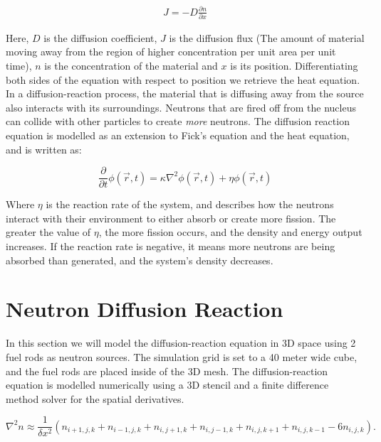 \documentclass[letterpaper, 12pt]{article}
\begin{document}
         \begin{align*}
            J = -D \frac{\partial n}{\partial x}
         \end{align*}

         Here, $D$ is the diffusion coefficient, $J$ is the diffusion flux (The amount of material moving away from the region of higher concentration per unit area per unit time), $n$ is the concentration of the material and $x$ is its position. Differentiating both sides of the equation with respect to position we retrieve the heat equation.\\

         In a diffusion-reaction process, the material that is diffusing away from the source also interacts with its surroundings. Neutrons that are fired off from the nucleus can collide with other particles to create \textit{more} neutrons. The diffusion reaction equation is modelled as an extension to Fick's equation and the heat equation, and is written as:

         \begin{equation}
            \frac{\partial}{\partial t} \phi (\vec{r}, t) = \kappa \nabla^2 \phi (\vec{r}, t) + \eta \phi (\vec{r}, t)
         \end{equation}

         Where $\eta$ is the reaction rate of the system, and describes how the neutrons interact with their environment to either absorb or create more fission. The greater the value of $\eta$, the more fission occurs, and the density and energy output increases. If the reaction rate is negative, it means more neutrons are being absorbed than generated, and the system's density decreases.
    \section{ Neutron Diffusion Reaction}
      In this section we will model the diffusion-reaction equation in 3D space using 2 fuel rods as neutron sources. The simulation grid is set to a 40 meter wide cube, and the fuel rods are placed inside of the 3D mesh. The diffusion-reaction equation is modelled numerically using a 3D stencil and a finite difference method solver for the spatial derivatives.

      \begin{equation}
         \nabla^2 n \approx \frac{1}{\delta x^2} \left( n_{i+1, j, k} + n_{i-1, j, k} + n_{i, j+1, k} + n_{i, j-1, k} + n_{i, j, k+1} + n_{i, j, k-1} - 6n_{i, j, k} \right).
      \end{equation}
\end{document}
